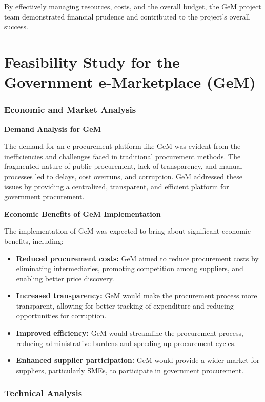 By effectively managing resources, costs, and the overall budget, the GeM project team demonstrated financial prudence and contributed to the project's overall success.

\section{Feasibility Study for the Government e-Marketplace (GeM)}

\subsubsection{Economic and Market Analysis}

\textbf{Demand Analysis for GeM}

The demand for an e-procurement platform like GeM was evident from the inefficiencies and challenges faced in traditional procurement methods. The fragmented nature of public procurement, lack of transparency, and manual processes led to delays, cost overruns, and corruption. GeM addressed these issues by providing a centralized, transparent, and efficient platform for government procurement.

\textbf{Economic Benefits of GeM Implementation}

The implementation of GeM was expected to bring about significant economic benefits, including:

\begin{itemize}
    \item \textbf{Reduced procurement costs:} GeM aimed to reduce procurement costs by eliminating intermediaries, promoting competition among suppliers, and enabling better price discovery.
    \item \textbf{Increased transparency:} GeM would make the procurement process more transparent, allowing for better tracking of expenditure and reducing opportunities for corruption.
    \item \textbf{Improved efficiency:} GeM would streamline the procurement process, reducing administrative burdens and speeding up procurement cycles.
    \item \textbf{Enhanced supplier participation:} GeM would provide a wider market for suppliers, particularly SMEs, to participate in government procurement.
\end{itemize}

\subsubsection{Technical Analysis}

